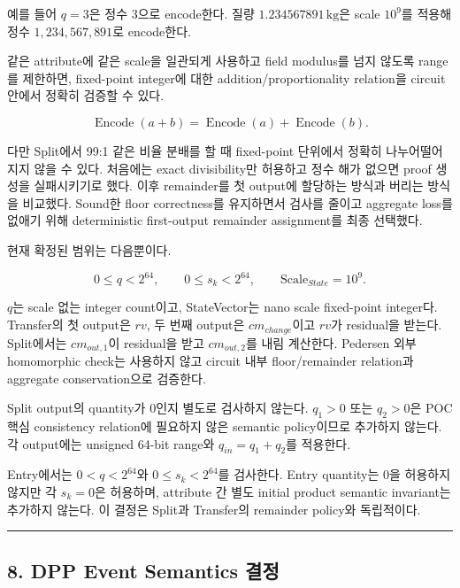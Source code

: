\documentclass[11pt]{extarticle}
\begin{document}
예를 들어 $q=3$은 정수 3으로 encode한다. 질량
$1.234567891\,\mathrm{kg}$은 scale $10^9$를 적용해 정수
$1{,}234{,}567{,}891$로 encode한다.

같은 attribute에 같은 scale을 일관되게 사용하고 field modulus를 넘지
않도록 range를 제한하면, fixed-point integer에 대한
addition/proportionality relation을 circuit 안에서 정확히 검증할 수
있다.

\[
\operatorname{Encode}(a+b)=\operatorname{Encode}(a)+\operatorname{Encode}(b).
\]

다만 Split에서 99:1 같은 비율 분배를 할 때 fixed-point 단위에서 정확히
나누어떨어지지 않을 수 있다. 처음에는 exact divisibility만 허용하고 정수 해가
없으면 proof 생성을 실패시키기로 했다. 이후 remainder를 첫 output에 할당하는
방식과 버리는 방식을 비교했다. Sound한 floor correctness를 유지하면서 검사를
줄이고 aggregate loss를 없애기 위해 deterministic first-output remainder
assignment를 최종 선택했다.

현재 확정된 범위는 다음뿐이다.

\[
0\leq q<2^{64},
\qquad
0\leq s_k<2^{64},
\qquad
\mathrm{Scale}_{State}=10^9.
\]

$q$는 scale 없는 integer count이고, StateVector는 nano scale fixed-point
integer다. Transfer의 첫 output은 $rv$, 두 번째 output은 $cm_{change}$이고
$rv$가 residual을 받는다. Split에서는 $cm_{out,1}$이 residual을 받고
$cm_{out,2}$를 내림 계산한다. Pedersen 외부 homomorphic check는 사용하지 않고
circuit 내부 floor/remainder relation과 aggregate conservation으로 검증한다.

Split output의 quantity가 0인지 별도로 검사하지 않는다. $q_1>0$ 또는 $q_2>0$은
POC 핵심 consistency relation에 필요하지 않은 semantic policy이므로 추가하지 않는다.
각 output에는 unsigned 64-bit range와 $q_{in}=q_1+q_2$를 적용한다.

Entry에서는 $0<q<2^{64}$와 $0\leq s_k<2^{64}$를 검사한다. Entry quantity는
0을 허용하지 않지만 각 $s_k=0$은 허용하며, attribute 간 별도 initial product
semantic invariant는 추가하지 않는다. 이 결정은 Split과 Transfer의 remainder
policy와 독립적이다.

\begin{center}\rule{0.5\linewidth}{0.5pt}\end{center}

\subsection{8. DPP Event Semantics
결정}\label{8-dpp-event-semantics-uxacb0uxc815}
\end{document}
